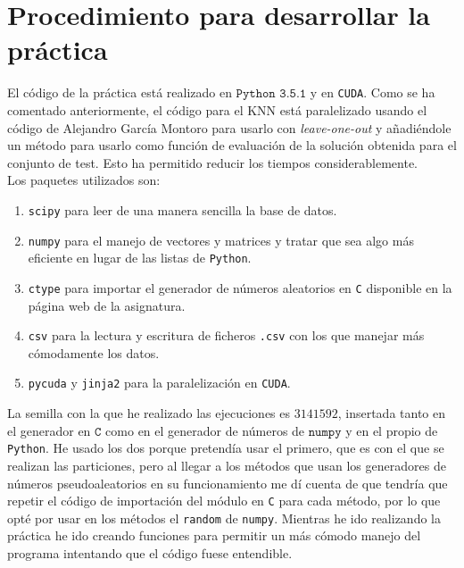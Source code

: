 \documentclass[11pt,leqno]{article}
\begin{document}
\section{Procedimiento para desarrollar la práctica}

El código de la práctica está realizado en $\texttt{Python 3.5.1}$ y en \texttt{CUDA}. Como se ha comentado anteriormente, el código para el KNN está paralelizado usando el código de Alejandro García Montoro para usarlo con \textit{leave-one-out} y añadiéndole un método para usarlo como función de evaluación de la solución obtenida para el conjunto de test. Esto ha permitido reducir los tiempos considerablemente.\\
Los paquetes utilizados son:
\begin{enumerate}
	\item \texttt{scipy} para leer de una manera sencilla la base de datos.
	\item \texttt{numpy} para el manejo de vectores y matrices y tratar que sea algo más eficiente en lugar de las listas de \texttt{Python}.
	\item \texttt{ctype} para importar el generador de números aleatorios en \texttt{C} disponible en la página web de la asignatura. 
	\item \texttt{csv} para la lectura y escritura de ficheros \texttt{.csv} con los que manejar más cómodamente los datos.
	\item \texttt{pycuda} y \texttt{jinja2} para la paralelización en \texttt{CUDA}.
\end{enumerate}	

	La semilla con la que he realizado las ejecuciones es $3141592$, insertada tanto en el generador en $\texttt{C}$ como en el generador de números de $\texttt{numpy}$ y en el propio de \texttt{Python}. He usado los dos porque pretendía usar el primero, que es con el que se realizan las particiones, pero al llegar a los métodos que usan los generadores de números pseudoaleatorios en su funcionamiento me dí cuenta de que tendría que repetir el código de importación del módulo en \texttt{C} para cada método, por lo que opté por usar en los métodos el \texttt{random} de \texttt{numpy}. Mientras he ido realizando la práctica he ido creando funciones para permitir un más cómodo manejo del programa intentando que el código fuese entendible.
	
\end{document}
